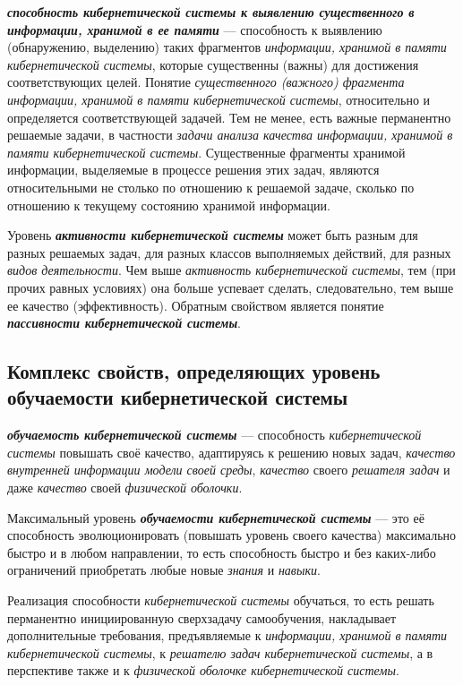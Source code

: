 \textbf{\textit{способность кибернетической системы к выявлению существенного в информации, хранимой в ее памяти}} --- способность к выявлению (обнаружению, выделению) таких фрагментов \textit{информации, хранимой в памяти кибернетической системы}, которые существенны (важны) для достижения соответствующих целей. Понятие \textit{существенного (важного) фрагмента информации, хранимой в памяти кибернетической системы}, относительно и определяется соответствующей задачей. Тем не менее, есть важные перманентно решаемые задачи, в частности \textit{задачи анализа качества информации, хранимой в памяти кибернетической системы}. Существенные фрагменты хранимой информации, выделяемые в процессе решения этих задач, являются относительными не столько по отношению к решаемой задаче, сколько по отношению к текущему состоянию хранимой информации.

Уровень \textbf{\textit{активности кибернетической системы}} может быть разным для разных решаемых задач, для разных классов выполняемых действий, для разных \textit{видов деятельности}. Чем выше \textit{активность кибернетической системы}, тем (при прочих равных условиях) она больше успевает сделать, следовательно, тем выше ее качество (эффективность). Обратным свойством является понятие \textbf{\textit{пассивности кибернетической системы}}. 

\subsection{Комплекс свойств, определяющих уровень обучаемости кибернетической системы}
{\label{sec_cyb_syst_learnability_quality}} 

\textbf{\textit{обучаемость кибернетической системы}} --- способность \textit{кибернетической системы} повышать своё качество, адаптируясь к решению новых задач, \textit{качество внутренней информации модели своей среды}, \textit{качество} своего \textit{решателя задач} и даже \textit{качество} своей \textit{физической оболочки}. 

Максимальный уровень \textbf{\textit{обучаемости кибернетической системы}} --- это её способность эволюционировать (повышать уровень своего качества) максимально быстро и в любом направлении, то есть способность быстро и без каких-либо ограничений приобретать любые новые \textit{знания} и \textit{навыки}.

Реализация способности \textit{кибернетической системы} обучаться, то есть решать перманентно инициированную сверхзадачу самообучения, накладывает дополнительные требования, предъявляемые к \textit{информации, хранимой в памяти кибернетической системы}, к \textit{решателю задач кибернетической системы}, а в перспективе также и к \textit{физической оболочке кибернетической системы}.

